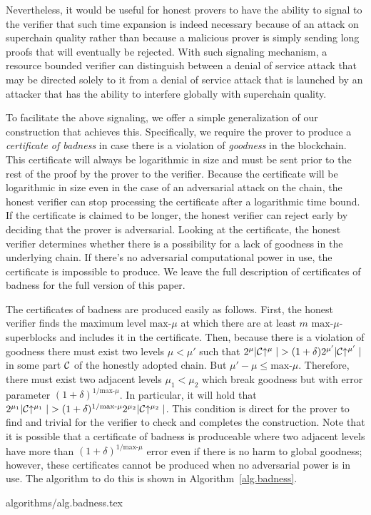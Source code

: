%
Nevertheless, it would be useful for honest provers to have the ability to
signal to the verifier that such time expansion is indeed necessary because of
an attack on superchain quality rather than because a malicious prover is simply
sending long proofs that will eventually be rejected. With such signaling
mechanism, a resource bounded verifier can distinguish between a denial of
service attack that may be directed solely to it from  a denial of service
attack that  is launched by an attacker that has the ability to  interfere
globally with superchain quality.

To facilitate the above signaling, we offer a simple generalization of our
construction that achieves this.
Specifically, we require the prover to produce a \textit{certificate of badness}
in case there is a violation of \textit{goodness} in the blockchain. This
certificate will always be logarithmic in size and must be sent prior to the
rest of the proof by the prover to the verifier. Because the certificate will be
logarithmic in size even in the case of an adversarial attack on the chain, the
honest verifier can stop processing the certificate after a logarithmic time
bound. If the certificate is claimed to be longer, the honest verifier can
reject early by deciding that the prover is adversarial. Looking at the
certificate, the honest verifier determines whether there is a possibility for a
lack of goodness in the underlying chain. If there's no adversarial
computational power in use, the certificate is impossible to produce. We leave
the full description of certificates of badness for the full version of this
paper.

The certificates of badness are produced easily as follows. First, the honest
verifier finds the maximum level $\text{max-}\mu$ at which there are at least
$m$ $\text{max-}\mu$-superblocks and includes it in the certificate. Then,
because there is a violation of goodness there must exist two levels $\mu <
\mu'$ such that $2^\mu|\mathcal{C}\negthickspace\uparrow^\mu| > (1 +
\delta)2^{\mu'}|\mathcal{C}\negthickspace\uparrow^{\mu'}|$ in some part $\mathcal{C}$ of the honestly
adopted chain. But $\mu' - \mu \leq \text{max-}\mu$. Therefore, there must exist
two adjacent levels $\mu_1 < \mu_2$ which break goodness but with error
parameter $(1 + \delta)^{1/{\text{max-}\mu}}$. In particular, it will hold that
$2^{\mu_1}|\mathcal{C}\negthickspace\uparrow^{\mu_1}| > (1 +
\delta)^{1/{\text{max-}\mu}}2^{\mu_2}|\mathcal{C}\negthickspace\uparrow^{\mu_2}|$. This condition
is direct for the prover to find and trivial for the verifier to check and
completes the construction. Note that it is possible that a certificate of
badness is produceable where two adjacent levels have more than $(1 +
\delta)^{1/{\text{max-}\mu}}$ error even if there is no harm to global goodness;
however, these certificates cannot be produced when no adversarial power is in
use. The algorithm to do this is shown in Algorithm~\ref{alg.badness}.

{algorithms/alg.badness.tex}
